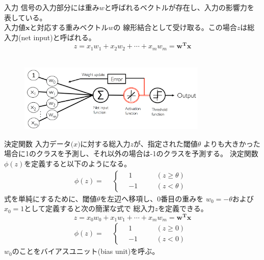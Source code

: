\documentclass[aspectratio=169, dvipdfmx, 11pt]{beamer} %
\begin{document}
\begin{frame}{入力}
    信号の入力部分には重み\(w\)と呼ばれるベクトルが存在し、入力の影響力を表している。 \\
    入力値\(\mathbf{x}\)と対応する重みベクトル\boldmath\(w\)の
    線形結合として受け取る。この場合\(z\)は総入力(net input)と呼ばれる。
    \\
    \begin{equation*}
        z = x_1w_1 + x_2w_2 + \cdots  + x_mw_m = \mathbf{w^T}\mathbf{x}
    \end{equation*}
    \\
    \begin{figure}[b]
        \begin{center}
        \includegraphics[width=90mm]{img/day01/fig08.png}
        \end{center}
    \end{figure}
\end{frame}

\begin{frame}{決定関数}
    入力データ\(\mathbf(x)\)に対する総入力\(z\)が、指定された閾値\(\theta\)
    よりも大きかった場合に1のクラスを予測し、それ以外の場合は-1のクラスを予測する。
    決定関数\(\phi(z)\)を定義すると以下のようになる。
    \begin{equation*}
        \phi(z) = 
        \begin{aligned}
            & \left\{ \,
                \begin{aligned}
                    &  1 & \quad &(z \geq \theta) \\
                    & -1 & \quad &(z < \theta)
                \end{aligned}
            \right.
        \end{aligned}
    \end{equation*}
    式を単純にするために、閾値\(\theta\)を左辺へ移項し、0番目の重みを
    \(w_0 = -\theta\)および\(x_0 = 1\)として定義すると次の簡潔な式で
    総入力\(z\)を定義できる。
    \begin{equation*}
        z = x_0w_0 + x_1w_1 + \cdots  + x_mw_m = \mathbf{w^T}\mathbf{x}
    \end{equation*}
    \begin{equation*}
        \phi(z) = 
        \begin{aligned}
            & \left\{ \,
                \begin{aligned}
                    &  1 & \quad &(z \geq 0) \\
                    & -1 & \quad &(z < 0)
                \end{aligned}
            \right.
        \end{aligned}
    \end{equation*}
    \(w_0\)のことをバイアスユニット(bias unit)を呼ぶ。
\end{frame}
\end{document}

